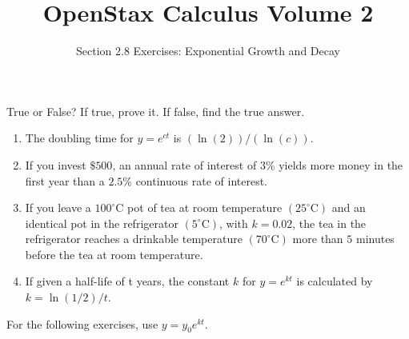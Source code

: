 \documentclass{exercises}
\title{OpenStax Calculus Volume 2}
\subtitle{Section 2.8 Exercises: Exponential Growth and Decay}
\author{}
\date{}
\begin{document}
\maketitle


True or False? If true, prove it. If false, find the true answer.

\begin{enumerate}[start=1]
\item The doubling time for $y=e^{ct}$ is $(\ln (2))/(\ln (c))$.
\item If you invest $\$500$, an annual rate of interest of $3\%$ yields more money in the first year than a $2.5\%$ continuous rate of interest.
\item If you leave a $100^\circ \text{C}$ pot of tea at room temperature $(25^\circ \text{C})$ and an identical pot in the refrigerator $(5^\circ \text{C})$, with $k=0.02$, the tea in the refrigerator reaches a drinkable temperature $(70^\circ \text{C})$ more than $5$ minutes before the tea at room temperature.
\item If given a half-life of t years, the constant $k$ for $y=e^{kt}$ is calculated by $k=\ln (1/2)/t$.
\end{enumerate}

For the following exercises, use $y=y_{0}e^{kt}$.
\end{document}
